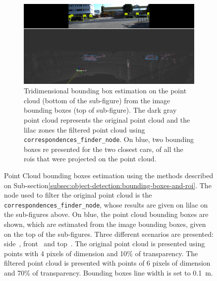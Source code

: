 \begin{figure}[ht!]
	\centering
	\begin{subfigure}[c]{0.8\textwidth}
		\includegraphics[width=\textwidth]{img/image-object-to-point-cloud/bboxes-side-view.png}
		\caption{Tridimensional bounding box estimation on the point cloud (bottom of the sub-figure) from the image bounding boxes (top of sub-figure). The dark gray point cloud represents the original point cloud and the lilac zones the filtered point cloud using \texttt{correspondences\_finder\_node}. On blue, two bounding boxes re presented for the two closest cars, of all the \acp{roi} that were projected on the point cloud.}
		\label{fig:bboxes-3d-kitti-side}
	\end{subfigure}
	\caption{Point Cloud bounding boxes estimation using the methods described on Sub-section\ref{subsec:object-detection:bounding-boxes-and-roi}. The node used to filter the original point cloud is the \texttt{correspondences\_finder\_node}, whose results are given on lilac on the sub-figures above. On blue, the point cloud bounding boxes are shown, which are estimated from the image bounding boxes, given on the top of the sub-figures. Three different scenarios are presented: side~, front~ and top~. The original point cloud is presented using points with 4 pixels of dimension and 10\% of transparency. The filtered point cloud is presented with points of 6 pixels of dimension and 70\% of transparency. Bounding boxes line width is set to \SI{0.1}{\meter}.} 
	\label{fig:bboxes-3d-kitti}
\end{figure}

